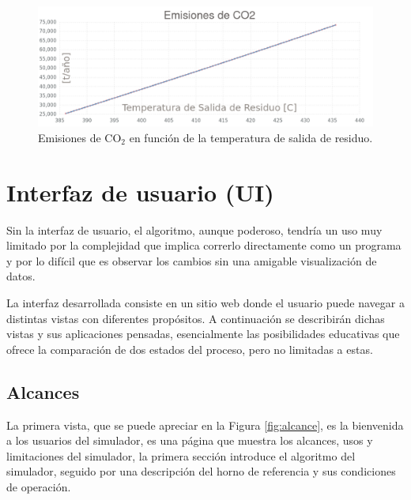 \begin{figure}[hbt]
\begin{center}
\includegraphics[scale=0.38]{images/graph-t_out-emi}
\caption[Emisiones de CO$_2$ vs Temperatura de salida de residuo]{Emisiones de CO$_2$ en función de la temperatura de salida de residuo.}
\label{fig:graph-t_out-emi}
\end{center}
\end{figure}

\section{Interfaz de usuario (UI)}

\par Sin la interfaz de usuario, el algoritmo, aunque poderoso, tendría un uso muy limitado por la complejidad que implica correrlo directamente como un programa y por lo difícil que es observar los cambios sin una amigable visualización de datos.

\par La interfaz desarrollada consiste en un sitio web donde el usuario puede navegar a distintas vistas con diferentes propósitos. A continuación se describirán dichas vistas y sus aplicaciones pensadas, esencialmente las posibilidades educativas que ofrece la comparación de dos estados del proceso, pero no limitadas a estas.

\subsection{Alcances}

\par La primera vista, que se puede apreciar en la Figura \ref{fig:alcance}, es la bienvenida a los usuarios del simulador, es una página que muestra los alcances, usos y limitaciones del simulador, la primera sección introduce el algoritmo del simulador, seguido por una descripción del horno de referencia y sus condiciones de operación.

